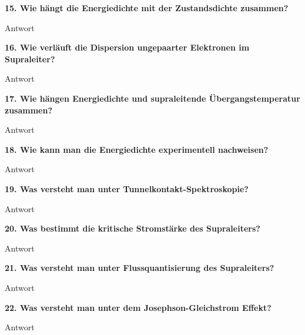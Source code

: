 \noindent\textbf{15. Wie hängt die Energiedichte mit der Zustandsdichte zusammen?}\\
\begin{addmargin}[25pt]{0pt}
Antwort\\
\end{addmargin}

\noindent\textbf{16. Wie verläuft die Dispersion ungepaarter Elektronen im Supraleiter?}\\
\begin{addmargin}[25pt]{0pt}
Antwort\\
\end{addmargin}

\noindent\textbf{17. Wie hängen Energiedichte und supraleitende Übergangstemperatur zusammen?}\\
\begin{addmargin}[25pt]{0pt}
Antwort\\
\end{addmargin}

\noindent\textbf{18. Wie kann man die Energiedichte experimentell nachweisen?}\\
\begin{addmargin}[25pt]{0pt}
Antwort\\
\end{addmargin}

\noindent\textbf{19. Was versteht man unter Tunnelkontakt-Spektroskopie?}\\
\begin{addmargin}[25pt]{0pt}
Antwort\\
\end{addmargin}

\noindent\textbf{20. Was bestimmt die kritische Stromstärke des Supraleiters?}\\
\begin{addmargin}[25pt]{0pt}
Antwort\\
\end{addmargin}

\noindent\textbf{21. Was versteht man unter Flussquantisierung des Supraleiters?}\\
\begin{addmargin}[25pt]{0pt}
Antwort\\
\end{addmargin}

\noindent\textbf{22. Was versteht man unter dem Josephson-Gleichstrom Effekt?}\\
\begin{addmargin}[25pt]{0pt}
Antwort\\
\end{addmargin}

